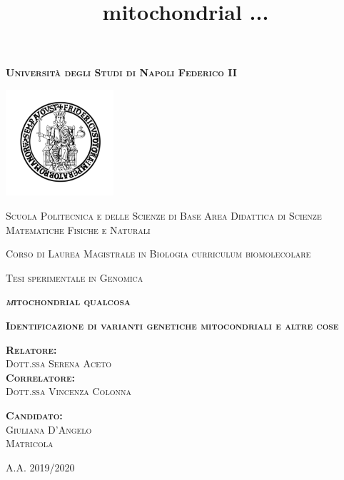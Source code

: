\documentclass[
11pt, %
oneside, %
english, %
singlespacing, %
headsepline, %
]{MastersDoctoralThesisV2} %
\title{ mitochondrial ... 
\newline }
\author{ }
\date{}
\begin{document}
\begin{titlepage}
\centering
{\scshape\large\normalfont\bfseries Università degli Studi di Napoli Federico II \par}
 \vspace{0.7cm} 
 \includegraphics[width=0.30\textwidth]{Fig/logo.png}
 \par
 \vspace{0.5cm}
\hspace{2cm}
{\scshape\large\normalfont Scuola Politecnica e delle Scienze di Base
\newline
Area Didattica di Scienze Matematiche Fisiche e Naturali
 \par}
 \vspace{0.5cm}
{\scshape\large\normalfont Corso di Laurea Magistrale in Biologia curriculum biomolecolare
 \par}
 \vspace{0.5cm} 
{\scshape\large\normalfont Tesi sperimentale in Genomica
 \par}
  \vspace{0.8cm}
{\scshape\large\normalfont\bfseries\textit mitochondrial qualcosa
 \par}
  \vspace{0.8cm}
{\scshape\large\normalfont\bfseries  Identificazione di varianti genetiche mitocondriali e altre cose 
 \par} 
\vspace{2cm} 
\begin{minipage}{0.45\textwidth}
{\scshape\normalfont\large\bfseries Relatore:}\\
{\scshape\normalfont\large Dott.ssa Serena Aceto} \\ 
{\scshape\normalfont\large\bfseries Correlatore:} \\
{\scshape\normalfont\large Dott.ssa Vincenza Colonna}\\
\end{minipage}
\hspace{2.5cm}
\begin{minipage}{0.25\textwidth}
{\scshape\normalfont\large\bfseries Candidato:}\\
 {\scshape\normalfont\large Giuliana D'Angelo \\
 Matricola } 
\end{minipage}

\vfill
\centering
\vspace{0.48cm} 
{\scshape\Large\normalfont A.A. 2019/2020}

\end{titlepage}
\end{document}
